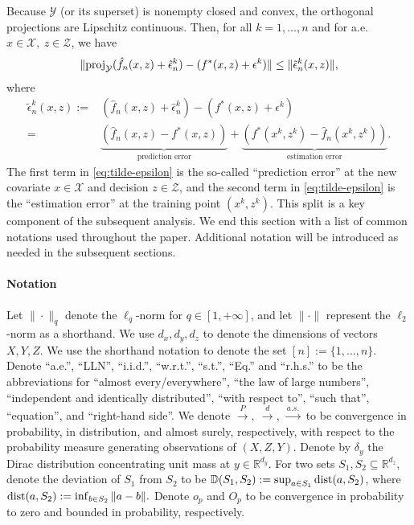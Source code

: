 \documentclass[onefignum,onetabnum]{siamart251216}
\begin{document}
Because $\mathcal{Y}$ (or its superset) is nonempty closed and convex, the orthogonal projections are Lipschitz continuous. Then, for all $k=1,\ldots,n$ and for a.e.\ $x \in \mathcal{X},\ z \in \mathcal{Z}$, we have 
\begin{align}\label{eq:projection lip}
    \|{\rm{proj}}_\mathcal{Y} (\hat{f}_n(x,z)+\hat{\epsilon}_n^k)-(f^*(x,z)+\epsilon^k)\| \leq \|\tilde{\epsilon}_n^k(x,z)\|, 
\end{align}
where 
\begin{align}
    \tilde{\epsilon}_n^k(x,z):=&(\hat{f}_n(x,z)+ \hat{\epsilon}_n^k)-(f^*(x,z)+\epsilon^k)\nonumber\\
    =& \underbrace{(\hat{f}_n(x,z)-f^*(x,z))}_{\text{prediction error}} + \underbrace{(f^*(x^k,z^k)-\hat{f}_n(x^k,z^k))}_{\text{estimation error}}. \label{eq:tilde-epsilon}
\end{align}
The first term in \eqref{eq:tilde-epsilon} is the so-called ``prediction error'' at the new covariate $x \in \mathcal{X}$ and decision $z\in\mathcal{Z}$, and the second term in \eqref{eq:tilde-epsilon} is the ``estimation error'' at the training point $(x^k,z^k).$ 
This split is a key component of the subsequent analysis. %
We end this section with a list of common notations used throughout the paper. Additional notation will be introduced as needed in the subsequent sections. 

\paragraph{Notation} Let $\|\cdot\|_q$ denote the $\ell_q$-norm for $q \in [1,+\infty]$, and let $\|\cdot\|$ represent the $\ell_2$-norm as a shorthand. We use $d_x, d_y, d_z$ to denote the dimensions of vectors $X, Y, Z$.
We use the shorthand notation to denote the set $[n]:=\{1,\ldots,n\}$.
Denote ``a.e.'', ``LLN'', ``i.i.d.'', ``w.r.t.'', ``s.t.'', ``Eq.'' and ``r.h.s.'' to be the abbreviations for ``almost every/everywhere'', ``the law of large numbers'', ``independent and identically distributed'', ``with respect to'', ``such that'', ``equation'', and ``right-hand side''. We denote $\xrightarrow{P},\ \xrightarrow{d},\ \xrightarrow{a.s.}$ to be convergence in probability, in distribution, and almost surely, respectively, with respect to the probability measure generating observations of $(X,Z,Y)$. 
Denote by $\delta_y$ the Dirac distribution concentrating unit mass at $y \in \mathbb{R}^{d_y}$. For two sets $S_1,S_2 \subseteq \mathbb{R}^{d_z}$, denote the deviation of $S_1$ from $S_2$ to be $\mathbb{D}(S_1,S_2):= \sup_{a \in S_1}{\rm{dist}}(a, S_2)$, where ${\rm{dist}}(a,S_2):=\inf_{b \in S_2}\|a-b\|.$ Denote $o_p$ and $O_p$ to be convergence in probability to zero and bounded in probability, respectively.
\end{document}
